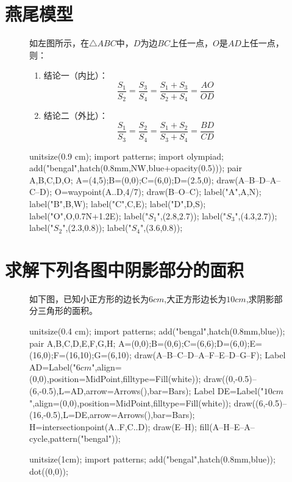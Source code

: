 \documentclass[12pt,space]{ctexart} %
\begin{document}
\section{燕尾模型}
\begin{figure}[ht]
	\begin{minipage}[b]{0.45\textwidth}
		如左图所示，在$\triangle ABC$中，$D$为边$BC$上任一点，$O$是$AD$上任一点，则：
		\begin{enumerate}
			\item 结论一（内比）：
			      \[
				      \frac{S_1}{S_2}=\frac{S_3}{S_4}=\frac{S_1+S_3}{S_2+S_4}=\frac{AO}{OD}
			      \]
			\item 结论二（外比）：
			      \[
				      \frac{S_1}{S_3}=\frac{S_2}{S_4}=\frac{S_1+S_2}{S_3+S_4}=\frac{BD}{CD}
			      \]
		\end{enumerate}
	\end{minipage}
	\qquad
	\begin{minipage}[b]{0.45\textwidth}
		\begin{asy}
			unitsize(0.9 cm);
			import patterns;
			import olympiad;
			add("bengal",hatch(0.8mm,NW,blue+opacity(0.5)));
			pair A,B,C,D,O;
			A=(4,5);B=(0,0);C=(6,0);D=(2.5,0);
			draw(A--B--D--A--C--D);
			O=waypoint(A..D,4/7);
			draw(B--O--C);
			label("A",A,N);
			label("B",B,W);
			label("C",C,E);
			label("D",D,S);
			label("O",O,0.7N+1.2E);
			label("$S_1$",(2.8,2.7));
			label("$S_3$",(4.3,2.7));
			label("$S_2$",(2.3,0.8));
			label("$S_4$",(3.6,0.8));
		\end{asy}
	\end{minipage}
\end{figure}
\vspace{1cm}
\section{求解下列各图中阴影部分的面积}
\begin{figure}[ht]
	\centering
	\begin{minipage}[b]{0.45\textwidth}
		如下图，已知小正方形的边长为$6cm$,大正方形边长为$10cm$,求阴影部分三角形的面积。\\
		\begin{asy}
			unitsize(0.4 cm);
			import patterns;
			add("bengal",hatch(0.8mm,blue));
			pair A,B,C,D,E,F,G,H;
			A=(0,0);B=(0,6);C=(6,6);D=(6,0);E=(16,0);F=(16,10);G=(6,10);
			draw(A--B--C--D--A--F--E--D--G--F);
			Label AD=Label("$6cm$",align=(0,0),position=MidPoint,filltype=Fill(white));
			draw((0,-0.5)--(6,-0.5),L=AD,arrow=Arrows(),bar=Bars);
			Label DE=Label("$10cm$",align=(0,0),position=MidPoint,filltype=Fill(white));
			draw((6,-0.5)--(16,-0.5),L=DE,arrow=Arrows(),bar=Bars);
			H=intersectionpoint(A..F,C..D);
			draw(E--H);
			fill(A--H--E--A--cycle,pattern("bengal"));
		\end{asy}
	\end{minipage}
	\qquad
	\begin{minipage}[b]{0.45\textwidth}
		\begin{asy}
			unitsize(1cm);
			import patterns;
			add("bengal",hatch(0.8mm,blue));
			dot((0,0));
		\end{asy}
	\end{minipage}
\end{figure}
\end{document}
